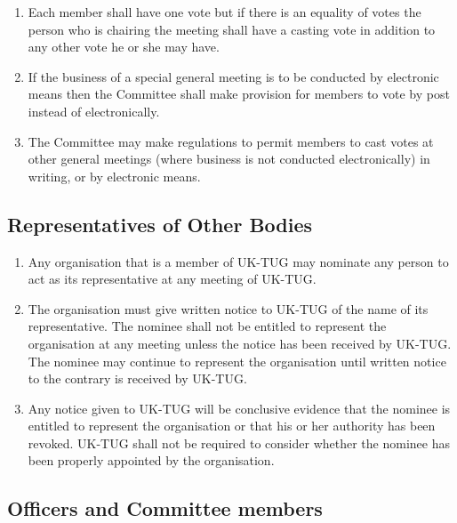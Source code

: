 \documentclass[a4paper,11pt]{article}
\begin{document}
\begin{enumerate}
\item Each member shall have one vote but if there is an equality of votes the
  person who is chairing the meeting shall have a casting vote in addition to
  any other vote he or she may have.
\item If the business of a special general meeting is to be conducted by electronic means
  then the Committee shall make provision for members to vote by post instead 
  of electronically.
\item The Committee may make regulations to permit members to cast votes at other general
  meetings (where business is not conducted electronically) in writing, or by electronic means.
\end{enumerate}

\subsection{Representatives of Other Bodies}

\begin{enumerate}
\item Any organisation that is a member of UK-TUG may nominate any person to act
  as its representative at any meeting of UK-TUG.
\item The organisation must give written notice to UK-TUG of the name of its
  representative. The nominee shall not be entitled to represent the
  organisation at any meeting unless the notice has been received by UK-TUG. The
  nominee may continue to represent the organisation until written notice to the
  contrary is received by UK-TUG.
\item Any notice given to UK-TUG will be conclusive evidence that the nominee is
  entitled to represent the organisation or that his or her authority has been
  revoked. UK-TUG shall not be required to consider whether the nominee has been
  properly appointed by the organisation.
\end{enumerate}

\subsection{Officers and Committee members}
\end{document}
